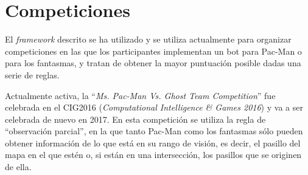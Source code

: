 \section{Competiciones}
El \textit{framework} descrito se ha utilizado y se utiliza actualmente para organizar competiciones en las que los participantes implementan un bot para Pac-Man o para los fantasmas, y tratan de obtener la mayor puntuación posible dadas una serie de reglas.
 
Actualmente activa, la ``\textit{Ms. Pac-Man Vs. Ghost Team Competition}'' fue celebrada en el CIG2016 \cite{CIG2016Page} (\textit{Computational Intelligence \& Games 2016}) y va a ser celebrada de nuevo en 2017. En esta competición se utiliza la regla de ``observación parcial'', en la que tanto Pac-Man como los fantasmas sólo pueden obtener información de lo que está en su rango de visión, es decir, el pasillo del mapa en el que estén o, si están en una intersección, los pasillos que se originen de ella.
